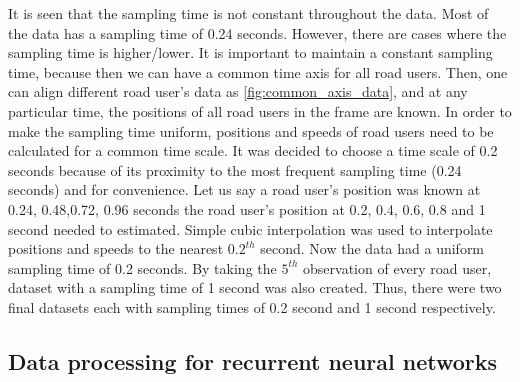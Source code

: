 \documentclass{article}
\begin{document}
It is seen that the sampling time is not constant throughout the data. Most of the data has a sampling time of 0.24 seconds. However, there are cases where the sampling time is higher/lower. It is important to maintain a constant sampling time, because then we can have a common time axis for all road users. Then, one can align different road user's data as \ref{fig:common_axis_data}, and at any particular time, the positions of all road users in the frame are known. In order to make the sampling time uniform, positions and speeds of road users need to be calculated for a common time scale. It was decided to choose a time scale of 0.2 seconds because of its proximity to the most frequent sampling time (0.24 seconds) and for convenience. Let us say a road user's position was known at 0.24, 0.48,0.72, 0.96 seconds the road user's position at 0.2, 0.4, 0.6, 0.8 and 1 second needed to estimated. Simple cubic interpolation was used to interpolate positions and speeds to the nearest $0.2^{th}$ second. Now the data had a uniform sampling time of 0.2 seconds. By taking the $5^{th}$ observation of every road user, dataset with a sampling time of 1 second was also  created.  Thus, there were two final datasets each with sampling times of 0.2 second and 1 second respectively. 

\subsection{Data processing for recurrent neural networks}
\end{document}

